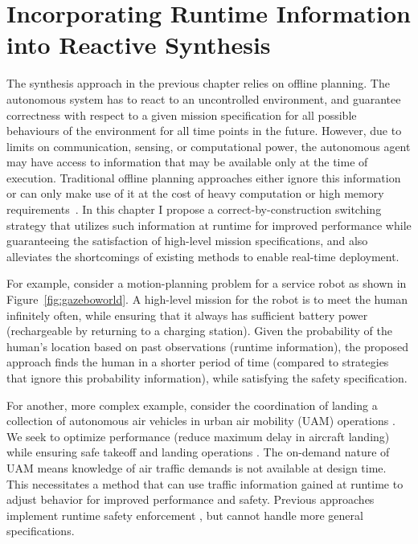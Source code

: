 

\chapter{Incorporating Runtime Information into Reactive Synthesis}
The synthesis approach in the previous chapter relies on offline planning. The autonomous system has to react to an uncontrolled environment, and guarantee correctness with respect to a given mission specification for all possible behaviours of the environment for all time points in the future. However, due to limits on communication, sensing, or computational power, the autonomous agent may have access to information that may be available only at the time of execution. Traditional offline planning approaches either ignore this information or can only make use of it at the cost of heavy computation or high memory requirements~\cite{Ehlerscost,jangcontinuous}. In this chapter I propose a correct-by-construction switching strategy that utilizes such information at runtime for improved performance while guaranteeing the satisfaction of high-level mission specifications, and also alleviates the shortcomings of existing methods to enable real-time deployment. 

For example, consider a motion-planning problem for a service robot as shown in Figure~\ref{fig:gazeboworld}. A high-level mission for the robot is to meet the human infinitely often, while ensuring that it always has sufficient battery power (rechargeable by returning to a charging station). Given the probability of the human's location based on past observations (runtime information), the proposed approach finds the human in a shorter period of time (compared to strategies that ignore this probability information), while satisfying the safety specification. 

For another, more complex example, consider the coordination of landing a collection of autonomous air vehicles in urban air mobility (UAM) operations \cite{goyal2018urban,gipson2017nasa}. 
We seek to optimize performance (reduce  maximum delay in aircraft landing) while ensuring safe takeoff and landing operations \cite{thipphavong2018urban}. The on-demand nature of UAM means knowledge of air traffic demands is not available at design time. This necessitates a method that can use traffic information gained at runtime to adjust behavior for improved performance and safety. Previous approaches implement runtime safety enforcement \cite{bhnfm, AlshiekhShield,Konighofer2017,8815233}, but cannot handle more general specifications. 

